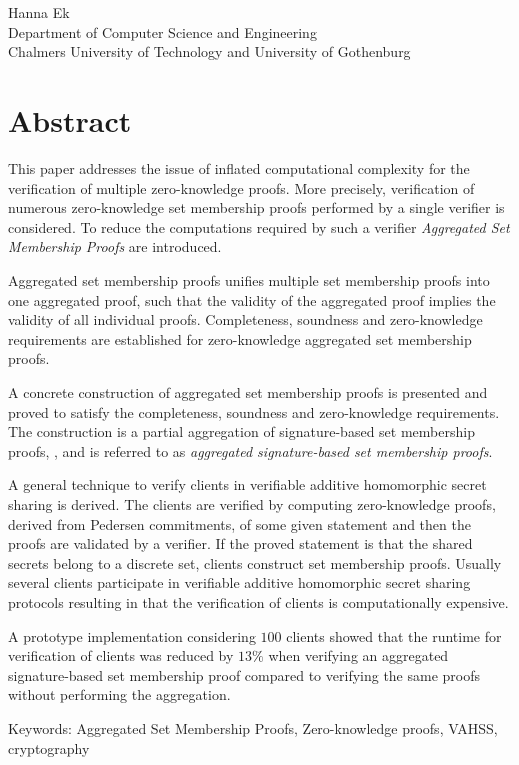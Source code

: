 \oneLineTitle\\
\oneLineSubtitle\\
Hanna Ek\\
Department of Computer Science and Engineering\\
Chalmers University of Technology and University of Gothenburg\setlength{\parskip}{0.5cm}

\thispagestyle{plain}			%
\setlength{\parskip}{0pt plus 1.0pt}
\section*{Abstract}
This paper addresses the issue of inflated computational complexity for the verification of multiple zero-knowledge proofs. More precisely, verification of numerous zero-knowledge set membership proofs performed by a single verifier is considered. To reduce the computations required by such a verifier \textit{Aggregated Set Membership Proofs} are introduced.

Aggregated set membership proofs unifies multiple set membership proofs into one aggregated proof, such that the validity of the aggregated proof implies the validity of all individual proofs. Completeness, soundness and zero-knowledge requirements are established for zero-knowledge aggregated set membership proofs.

A concrete construction of aggregated set membership proofs is presented and proved to satisfy the completeness, soundness and zero-knowledge requirements. The construction is a partial aggregation of signature-based set membership proofs, \cite{RANGE-SET}, and is referred to as \textit{aggregated signature-based set membership proofs}. %

A general technique to verify clients in verifiable additive homomorphic secret sharing is derived. The clients are verified by computing zero-knowledge proofs, derived from Pedersen commitments, of some given statement and then the proofs are validated by a verifier.  If the proved statement is that the shared secrets belong to a discrete set, clients construct set membership proofs. Usually several clients participate in verifiable additive homomorphic secret sharing  protocols resulting in that the verification of clients is computationally expensive.
 
A prototype implementation considering $100$ clients showed that the runtime for verification of clients was reduced by $13\%$ when verifying an aggregated signature-based set membership proof compared to verifying the same proofs without performing the aggregation. 




\vfill
Keywords: Aggregated Set Membership Proofs, Zero-knowledge proofs, VAHSS, cryptography

\newpage				%
\thispagestyle{empty}
\mbox{}